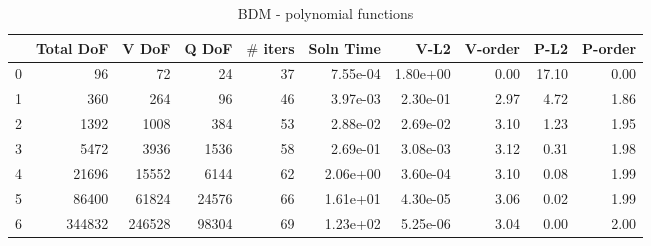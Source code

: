 \documentclass[12pt]{extarticle}
\numberwithin{equation}{section}    %
\begin{document}
\begin{landscape}
\begin{table}
\begin{tabular}{lrrrrrrrrr}
\hline
{} &  Total DoF &   V DoF &  Q DoF &  $\#$ iters &  Soln Time &      V-L2 &  V-order &   P-L2 &  P-order \\
\hline
0 &         96 &      72 &     24 &       37 &   7.55e-04 &  1.80e+00 &     0.00 &  17.10 &     0.00 \\
1 &        360 &     264 &     96 &       46 &   3.97e-03 &  2.30e-01 &     2.97 &   4.72 &     1.86 \\
2 &       1392 &    1008 &    384 &       53 &   2.88e-02 &  2.69e-02 &     3.10 &   1.23 &     1.95 \\
3 &       5472 &    3936 &   1536 &       58 &   2.69e-01 &  3.08e-03 &     3.12 &   0.31 &     1.98 \\
4 &      21696 &   15552 &   6144 &       62 &   2.06e+00 &  3.60e-04 &     3.10 &   0.08 &     1.99 \\
5 &      86400 &   61824 &  24576 &       66 &   1.61e+01 &  4.30e-05 &     3.06 &   0.02 &     1.99 \\
6 &     344832 &  246528 &  98304 &       69 &   1.23e+02 &  5.25e-06 &     3.04 &   0.00 &     2.00 \\
\hline
\end{tabular}


\caption{BDM - polynomial functions}

\end{table}

\end{landscape}
\end{document}
